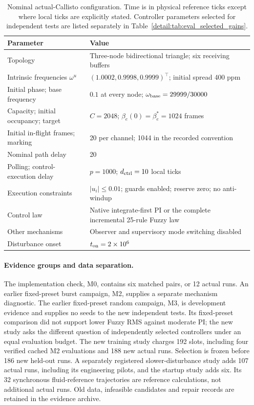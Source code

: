 \begin{table}[t]
\caption{Nominal actual-Callisto configuration. Time is in physical reference
ticks except where local ticks are explicitly stated. Controller parameters
selected for independent tests are listed separately in
Table~\ref{detail:tab:eval_selected_gains}.}
\label{detail:tab:eval_setup}
\centering
\begin{tabular}{@{}ll@{}}\toprule
Parameter & Value\\\midrule
Topology & Three-node bidirectional triangle; six receiving buffers\\
Intrinsic frequencies $\omega^u$ & $(1.0002,0.9998,0.9999)^\top$; initial spread 400 ppm\\
Initial phase; base frequency & $0.1$ at every node; $\omega_{\rm base}=29999/30000$\\
Capacity; initial occupancy; target & $C=2048$; $\beta_e(0)=\beta_e^*=1024$ frames\\
Initial in-flight frames; marking & 20 per channel; 1044 in the recorded convention\\
Nominal path delay & 20\\
Polling; control-execution delay & $p=1000$; $d_{\rm ctrl}=10$ local ticks\\
Execution constraints & $|u_i|\le0.01$; guards enabled; reserve zero; no anti-windup\\
Control law & Native integrate-first PI or the complete incremental 25-rule Fuzzy law\\
Other mechanisms & Observer and supervisory mode switching disabled\\
Disturbance onset & $t_{\rm on}=2\times10^6$\\\bottomrule
\end{tabular}
\end{table}

\paragraph{Evidence groups and data separation.}
The implementation check, M0, contains six matched pairs, or 12 actual
runs. An earlier fixed-preset burst campaign, M2, supplies a separate
mechanism diagnostic. The earlier fixed-preset random campaign, M3, is
development evidence and supplies no seeds to the new independent tests.
Its fixed-preset comparison did not support lower Fuzzy RMS against
moderate PI; the new study asks the different question of independently
selected controllers under an equal evaluation budget.
The new training study charges 192 slots, including four verified cached
M2 evaluations and 188 new actual runs. Selection is frozen before 186
new held-out runs. A separately registered slower-disturbance study adds
107 actual runs, including its engineering pilots, and the startup
study adds six. Its 32 synchronous fluid-reference trajectories are
reference calculations, not additional actual runs. Old data, infeasible
candidates and repair records are retained in the evidence archive.

